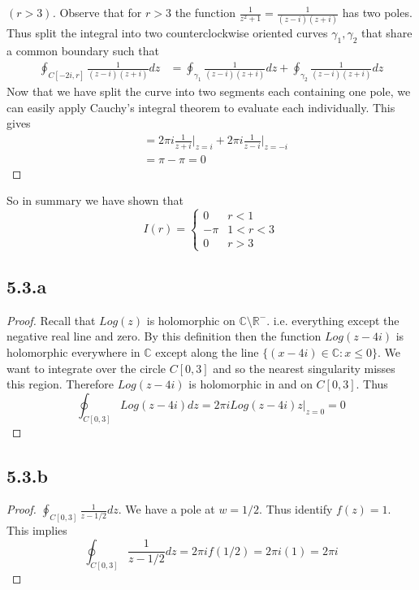 \documentclass[a4paper, 11pt]{article}
\begin{document}
	\begin{proof}[$(r>3)$]
		Observe that for $r>3$ the function $\frac{1}{z^2+1}=\frac{1}{(z-i)(z+i)}$ has two poles. Thus split the integral into two counterclockwise oriented curves $\gamma_1, \gamma_2$ that share a common boundary such that 	
			\begin{align*}
				\oint_{C[-2i, r]}\frac{1}{(z-i)(z+i)}dz &= \oint_{\gamma_1} \frac{1}{(z-i)(z+i)}dz + \oint_{\gamma_2} \frac{1}{(z-i)(z+i)}dz 
			\end{align*}
		\noindent Now that we have split the curve into two segments each containing one pole, we can easily apply Cauchy's integral theorem to evaluate each individually. This gives
			\begin{align*}
				&= 2\pi i \frac{1}{z+i}\big|_{z=i} + 2\pi i \frac{1}{z-i}\big|_{z=-i} \\
				&= \pi - \pi =  0
			\end{align*}
	\end{proof}
	
	\noindent So in summary we have shown that 
		\begin{equation*}
			I(r) = \begin{cases}
				0 & r < 1 \\ 
				-\pi & 1 < r < 3 \\ 
				0 & r > 3
			\end{cases}
		\end{equation*}
	
	
\subsection*{5.3.a} 
	\begin{proof}
		Recall that $Log(z)$ is holomorphic on $\mathbb{C}\setminus\mathbb{R}^{-}$. i.e. everything except the negative real line and zero. By this definition then the function $Log(z-4i)$ is holomorphic everywhere in $\mathbb{C}$ except along the line $\{(x-4i) \in \mathbb{C} : x\leq 0\}$. We want to integrate over the circle $C[0,3]$ and so the nearest singularity misses this region. Therefore $Log(z-4i)$ is holomorphic in and on $C[0,3]$. Thus 
			\begin{equation*}
				\oint_{C[0,3]}Log(z-4i)dz = 2\pi i Log(z-4i)z \big|_{z=0} = 0
			\end{equation*}
	\end{proof}
	
\subsection*{5.3.b}
	\begin{proof}
			$\oint_{C[0,3]}\frac{1}{z-1/2}dz$. We have a pole at $w=1/2$. Thus identify $f(z) = 1$. This implies
				\begin{equation*}
					\oint_{C[0,3]}\frac{1}{z-1/2}dz = 2\pi i f(1/2) = 2\pi i (1) = 2\pi i
				\end{equation*}

	\end{proof}
	
\end{document}
